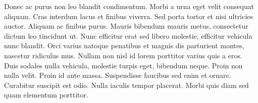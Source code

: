 \documentclass[polish,engineering]{wizthesis}
\begin{document}
Donec ac purus non leo blandit condimentum. Morbi a urna eget velit consequat aliquam. Cras interdum lacus et finibus viverra. Sed porta tortor et nisi ultricies auctor. Aliquam ac finibus purus. Mauris bibendum mauris metus, consectetur dictum leo tincidunt ut. Nunc efficitur erat sed libero molestie, efficitur vehicula nunc blandit.
Orci varius natoque penatibus et magnis dis parturient montes, nascetur ridiculus mus. Nullam non nisl id lorem porttitor varius quis a eros. Duis sodales nulla vehicula, molestie turpis eget, bibendum neque. Proin non nulla velit. Proin id ante massa. Suspendisse faucibus sed enim et ornare. Curabitur suscipit est odio. Nulla iaculis tempor placerat. Morbi quis diam sed quam elementum porttitor.




\listoffigures

\listoftables

\listoflistings
\end{document}
